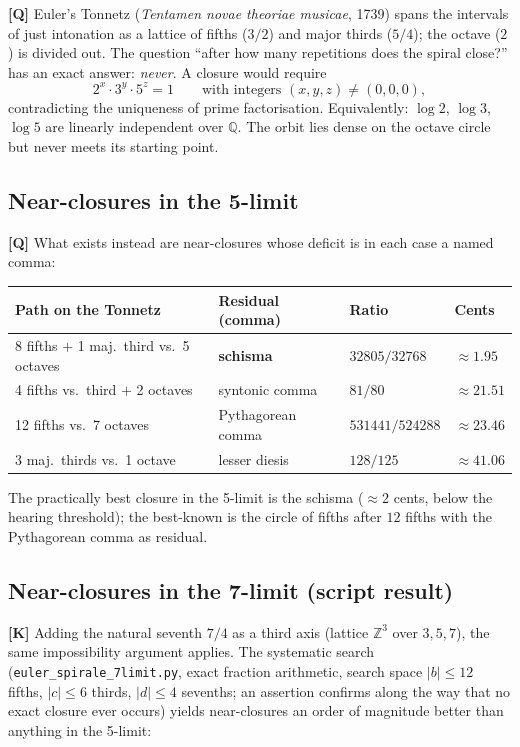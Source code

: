 \textbf{[Q]} Euler's Tonnetz (\emph{Tentamen novae theoriae musicae},
1739) spans the intervals of just intonation as a lattice of fifths
($3/2$) and major thirds ($5/4$); the octave ($2$) is divided out. The
question \enquote{after how many repetitions does the spiral close?}
has an exact answer: \emph{never}. A closure would require
\[
  2^{x}\cdot 3^{y}\cdot 5^{z} = 1
  \qquad\text{with integers } (x,y,z)\neq(0,0,0),
\]
contradicting the uniqueness of prime factorisation. Equivalently:
$\log 2$, $\log 3$, $\log 5$ are linearly independent over
$\mathbb{Q}$. The orbit lies dense on the octave circle but never meets
its starting point.

\subsection{Near-closures in the 5-limit}

\textbf{[Q]} What exists instead are near-closures whose deficit is in
each case a named comma:

\begin{center}
\begin{tabular}{llll}
\toprule
Path on the Tonnetz & Residual (comma) & Ratio & Cents \\
\midrule
8 fifths $+$ 1 maj.\ third vs.\ 5 octaves & \textbf{schisma} & $32805/32768$ & $\approx 1.95$ \\
4 fifths vs.\ third $+$ 2 octaves & syntonic comma & $81/80$ & $\approx 21.51$ \\
12 fifths vs.\ 7 octaves & Pythagorean comma & $531441/524288$ & $\approx 23.46$ \\
3 maj.\ thirds vs.\ 1 octave & lesser diesis & $128/125$ & $\approx 41.06$ \\
\bottomrule
\end{tabular}
\end{center}

The practically best closure in the 5-limit is the schisma
($\approx 2$ cents, below the hearing threshold); the best-known is
the circle of fifths after $12$ fifths with the Pythagorean comma as
residual.

\subsection{Near-closures in the 7-limit (script result)}

\textbf{[K]} Adding the natural seventh $7/4$ as a third axis (lattice
$\mathbb{Z}^3$ over $3,5,7$), the same impossibility argument applies.
The systematic search (\texttt{euler\_spirale\_7limit.py}, exact
fraction arithmetic, search space $|b|\le 12$ fifths, $|c|\le 6$
thirds, $|d|\le 4$ sevenths; an assertion confirms along the way that
no exact closure ever occurs) yields near-closures an order of
magnitude better than anything in the 5-limit:


